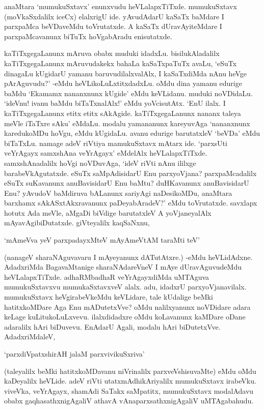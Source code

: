 anaMtara `mumukuSxtavx' enunxvudu heVLalapxTiTxde. mumukuSxtavx (moVkaSxdalilx iceCx) elalxrigU ide. yAvudAdarU kaSaTx baMdare I parxpaMca beVDaveMdu toVrutatxde. A kaSaTx dUravAyiteMdare I parxpaMcavanunx biTuTx hoVgabAradu enisutatxde.

kaTiTxgegaLanunx mAruva obabx muduki idadxLu. bisilukAladalilx kaTiTxgegaLanunx mAruvudakekx bahaLa kaSaTxpaTuTx avaLu, `eSuTx dinagaLu kUgidarU yamanu baruvudilalxvalAlx, I kaSaTxdiMda nAnu heVge pArAguvudu?' -eMdu heVLikoLuLxtitxdadxLu. oMdu dina yamanu edurige baMdu `Ekamamx nananxnunx kUgide' eMdu keVLidanu. muduki noVDidaLu. `ideVnu! ivanu baMdu biTaTxnalAlx!' eMdu yoVcisutAtx. `EnU ilalx. I kaTiTxgegaLanunx etitx etitx sAkAgide. kaTiTxgegaLanunx nananx taleya meVle iTaTxre sAku' eMdaLu. modalu yamananunx kareyuvAga `nananxnunx karedukoMDu hoVgu, eMdu kUgidaLu. avanu edurige barutatxleV `beVDa' eMdu biTaTxLu. namage adeV riVtiya mamukuSxtavx mAtarx ide. `parxsUti veYrAgayx samxshAna veYrAgayx' eMdelAlx heVLalapxTiTxde. samxshAnadalilx hoVgi noVDuvAga, `ideV riVti nAnu ililxge barabeVkAgutatxde. eSuTx saMpAdisidarU Enu parxyoVjana? parxpaMcadalilx eSuTx suKavanunx anuBavisidarU Enu baMtu? duHKavanunx anuBavisidarU Enu? yAvudoV baMdiruva bALanunx sariyAgi naDesikoMDu, anaMtara barxhamx sAkASxtAkxravanunx paDeyabAradeV?' eMdu toVrutatxde. savxlapx hotutx Ada meVle, aMgaDi biVdige barutatxleV A yoVjaneyalAlx mAyavAgibiDutatxde. giVteyalilx kaqSaNxnu,

\begin{shloka}
`mAmeVva yeV parxpadayxMteV mAyAmeVtAM taraMti teV'
\end{shloka}

(nanageV sharaNAguvavaru I mAyeyanunx dATutAtxre.) -eMdu heVLidAdxne. AdadxriMda BagavaMtanige sharaNAdareVneV I mAye dUravAguvudeMdu heVLalapxTiTxde. adhaRMbadhaR veYrAgayxdiMda uMTAguva mumukuSxtavxvu mumukaSxtavxveV alalx. adu, idadxrU parxyoVjanavilalx. mumukuSxtavx heVgirabeVkeMdu keVLidare, tale kUdalige beMki hatitxkoMDare Aga Enu mADutetxVve? oMdu nalilxyanunx noVDidare adara keLage kuLitukoLuLxvevu. ilalxdidadxre oMdu koLavanunx kaMDare oDane adaralilx hAri biDuvevu. EnAdarU Agali, modalu hAri biDutetxVve. AdadxriMdaleV,

\begin{shloka}
`parxdiVpatxshirAH jalaM parxvivikuSxriva'
\end{shloka}

(taleyalilx beMki hatitxkoMDavanu niVrinalilx parxveVshisuvaMte) eMdu oMdu kaDeyalilx heVLide. adeV riVti utatxmAdhikAriyalilx mumukuSxtavx irabeVku. viveVka, veYrAgayx, shamAdi SaTakx saMpatitx, mumukuSxtavx modalAdavu obabx gaqhasathxnigAgaliV athavA vAnaparxsathxnigAgaliV uMTAgabahudu.

